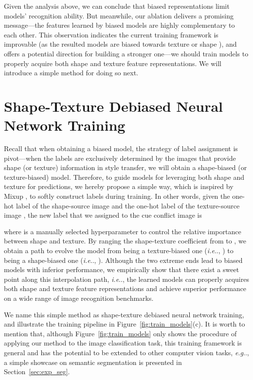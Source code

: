 \documentclass{article} \usepackage{iclr2021_conference,times}
\makeatletter
\DeclareRobustCommand\onedot{\futurelet\@let@token\@onedot}
\def\@onedot{\ifx\@let@token.\else.\null\fi\xspace}
\def\eg{\emph{e.g}\onedot} \def\Eg{\emph{E.g}\onedot}
\def\ie{\emph{i.e}\onedot} \def\Ie{\emph{I.e}\onedot}
\makeatother
\begin{document}
Given the analysis above, we can conclude that biased representations limit models' recognition ability. But meanwhile, our ablation delivers a promising message---the features learned by biased models are highly complementary to each other. This observation indicates the current training framework is improvable (as the resulted models are biased towards texture \citep{geirhos2018imagenettrained} or shape \citep{shi2020informative}), and offers a potential direction for building a stronger one---we should train models to properly acquire both shape and texture feature representations. We will introduce a simple method for doing so next.

\section{Shape-Texture Debiased Neural Network Training}
Recall that when obtaining a biased model, 
the strategy of label assignment is pivot---when the labels are exclusively determined by the images that provide shape (or texture) information in style transfer, we will obtain a shape-biased (or texture-biased) model.
Therefore, to guide models for leveraging both shape and texture for predictions, we hereby propose a simple way, which is inspired by Mixup \citep{zhang2018mixup}, to softly construct labels during training.
In other words, given the one-hot label of the shape-source image  
and the one-hot label of the texture-source image , the new label that we assigned to the cue conflict image is

where  is a manually selected hyperparameter to control the relative importance between shape and texture. 
By ranging the shape-texture coefficient  from  to ,
we obtain a path to evolve the model from being a texture-biased one (\ie, ) to being a shape-biased one (\ie, ).
Although the two extreme ends lead to biased models with inferior performance, we empirically show that there exist a sweet point along this interpolation path, \ie, the learned models can properly acquires both shape and texture feature representations and achieve superior performance on a wide range of image recognition benchmarks.


We name this simple method as shape-texture debiased neural network training, and illustrate the training pipeline in   Figure~\ref{fig:train_models}(c). 
It is worth to mention that, although Figure~\ref{fig:train_models} only shows the procedure of applying our method to the image classification task, this training framework is general and has the potential to be extended to other computer vision tasks, \eg, a simple showcase on semantic segmentation is presented in Section~\ref{sec:exp_seg}.
\end{document}
